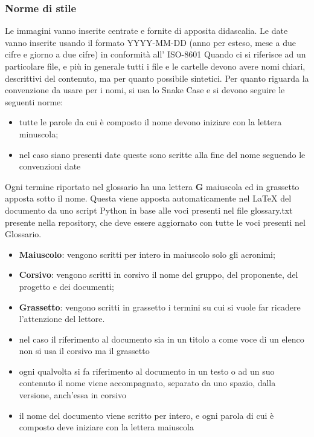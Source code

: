 	    \subsubsection{Norme di stile}
	    Le immagini vanno inserite centrate e fornite di apposita didascalia.
	    Le date vanno inserite usando il formato YYYY-MM-DD (anno per esteso, mese a due cifre e giorno a due cifre) in conformità all' ISO-8601
	    Quando ci si riferisce ad un particolare file, e più in generale tutti i file e le cartelle devono avere nomi chiari, descrittivi del contenuto, ma per quanto possibile sintetici.
	    Per quanto riguarda la convenzione da usare per i nomi, si usa lo Snake Case e si devono seguire le seguenti norme:
	    \begin{itemize}
	        \item tutte le parole da cui è composto il nome devono iniziare con la lettera minuscola;
	        \item nel caso siano presenti date queste sono scritte alla fine del nome seguendo le convenzioni date
	    \end{itemize}
	    Ogni termine riportato nel glossario ha una lettera \textbf{G} maiuscola ed in grassetto apposta sotto il nome. Questa viene apposta automaticamente nel LaTeX del documento da uno script Python in base alle voci presenti nel file glossary.txt presente nella repository, che deve essere aggiornato con tutte le voci presenti nel Glossario.
	    \begin{itemize}
	        \item \textbf{Maiuscolo}: vengono scritti per intero in maiuscolo solo gli acronimi;
	        \item \textbf{Corsivo}: vengono scritti in corsivo il nome del gruppo, del proponente, del progetto e dei documenti;
	        \item \textbf{Grassetto}: vengono scritti in grassetto i termini su cui si vuole far ricadere l'attenzione del lettore.
	    \end{itemize}
	    \begin{itemize}
	        \item nel caso il riferimento al documento sia in un titolo a come voce di un elenco non si usa il corsivo ma il grassetto
	        \item ogni qualvolta si fa riferimento al documento in un testo o ad un suo contenuto il nome viene accompagnato, separato da uno spazio, dalla versione, anch'essa in corsivo
	        \item il nome del documento viene scritto per intero, e ogni parola di cui è composto deve iniziare con la lettera maiuscola
	    \end{itemize}
